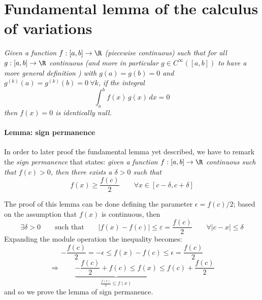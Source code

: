 \section{Fundamental lemma of the calculus of variations}
{\itshape Given a function $f:[a,b]\rightarrow \R$ (piecewise continuous) such that for all $g:[a,b] \rightarrow \R$ continuous (and more in particular $g \in C^\infty([a,b])$ to have a more general definition ) with $g(a) = g(b) = 0$ and $g^{(k)}(a) = g^{(k)}(b) = 0 \ \forall k$, if the integral 
	\begin{equation} \label{eq:func:lemma}
		\int_a^b f(x)\,g(x) \, dx = 0
	\end{equation}
	then $f(x)= 0 $ is identically null. }

\paragraph{Lemma: sign permanence} In order to later proof the fundamental lemma yet described, we have to remark the \textit{sign permanence} that states: {\itshape given a function $f:[a,b]\rightarrow \R$ continuous such that $f(c) >0$, then there exists a $\delta >0$ such that }
\[ f(x) \geq \frac{f(c)}{2} \qquad \forall x \in [c-\delta,c+\delta] \]

The proof of this lemma can be done defining the parameter $\epsilon = f(c) / 2$; based on the assumption that $f(x)$ is continuous, then
\[ \exists \delta >0 \qquad \textrm{such that} \qquad |f(x) - f(c)| \leq \varepsilon = \frac{f(c)}{2} \qquad \forall |c-x|\leq \delta \]
Expanding the module operation the inequality becomes:
\[ -\frac{f(c)}{2} = - \epsilon \leq f(x)-f(c) \leq \epsilon = \frac{f(c)}{2} \]
\[ \Rightarrow \qquad \underbrace{-\frac{f(c)}{2} + f(c) \leq f(x)}_{\frac{f(c)}{2} \leq f(x)} \leq f(c) + \frac{f(c)}{2} \]
and so we prove the lemma of sign permanence.

